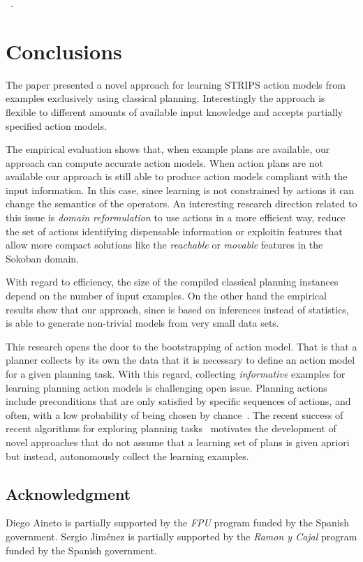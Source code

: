 \documentclass[letterpaper]{article} %
\begin{document}
~\cite{stern2017efficient}.


\section{Conclusions}
The paper presented a novel approach for learning STRIPS action models from examples exclusively using classical planning. Interestingly the approach is flexible to different amounts of available input knowledge and accepts partially specified action models.   

The empirical evaluation shows that, when example plans are available, our approach can compute accurate action models. When action plans are not available our approach is still able to produce action models compliant with the input information. In this case, since learning is not constrained by actions it can change the semantics of the operators. An interesting research direction related to this issue is {\em domain reformulation} to use actions in a more efficient way, reduce the set of actions identifying dispensable information or exploitin features that allow more compact solutions like the {\em reachable} or {\em movable} features in the Sokoban domain. 

With regard to efficiency, the size of the compiled classical planning instances depend on the number of input examples. On the other hand the empirical results show that our approach, since is based on inferences instead of statistics, is able to generate non-trivial models from very small data sets.

This research opens the door to the bootstrapping of action model. That is that a planner collects by its own the data that it is necessary to define an action model for a given planning task. With this regard, collecting {\em informative} examples for learning planning action models is challenging open issue. Planning actions include preconditions that are only satisfied by specific sequences of actions, and often, with a low probability of being chosen by chance~\cite{fern2004learning}. The recent success of recent algorithms for exploring planning tasks~\cite{geffner:novelty:IJCAI17} motivates the development of novel approaches that do not assume that a learning set of plans is given apriori but instead, autonomously collect the learning examples.


\subsection*{Acknowledgment}
\begin{small}
Diego Aineto is partially supported by the {\it FPU} program funded by the Spanish government. Sergio Jim\'enez is partially supported by the {\it Ramon y Cajal} program funded by the Spanish government.
\end{small}

\newpage



\end{document}
